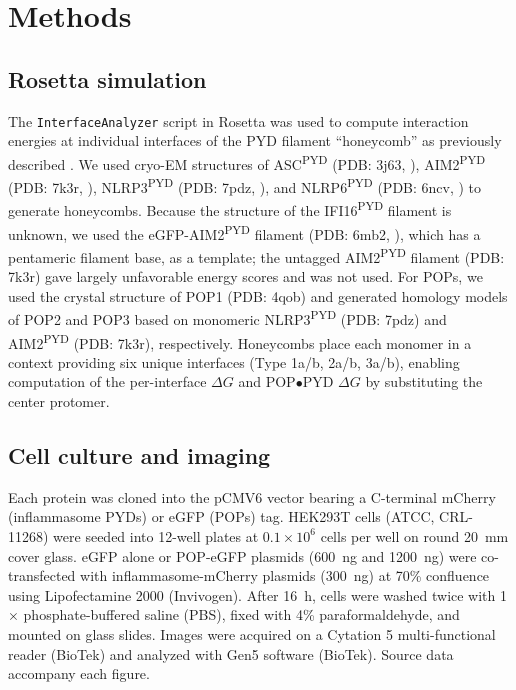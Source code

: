 \documentclass[11pt]{article}
\begin{document}
\section{Methods}
\subsection{Rosetta simulation}
The \texttt{InterfaceAnalyzer} script in Rosetta was used to compute interaction energies at individual interfaces of the PYD filament ``honeycomb'' as previously described \citep{matyszewski2021}. We used cryo-EM structures of ASC\textsuperscript{PYD} (PDB: 3j63, \citealp{lu2014}), AIM2\textsuperscript{PYD} (PDB: 7k3r, \citealp{matyszewski2021}), NLRP3\textsuperscript{PYD} (PDB: 7pdz, \citealp{hochheiser2022a}), and NLRP6\textsuperscript{PYD} (PDB: 6ncv, \citealp{shen2019}) to generate honeycombs. Because the structure of the IFI16\textsuperscript{PYD} filament is unknown, we used the eGFP-AIM2\textsuperscript{PYD} filament (PDB: 6mb2, \citealp{lu2015}), which has a pentameric filament base, as a template; the untagged AIM2\textsuperscript{PYD} filament (PDB: 7k3r) gave largely unfavorable energy scores and was not used. For POPs, we used the crystal structure of POP1 (PDB: 4qob) and generated homology models of POP2 and POP3 based on monomeric NLRP3\textsuperscript{PYD} (PDB: 7pdz) and AIM2\textsuperscript{PYD} (PDB: 7k3r), respectively. Honeycombs place each monomer in a context providing six unique interfaces (Type 1a/b, 2a/b, 3a/b), enabling computation of the per-interface $\Delta G$ and POP$\bullet$PYD $\Delta G$ by substituting the center protomer.

\subsection{Cell culture and imaging}
Each protein was cloned into the pCMV6 vector bearing a C-terminal mCherry (inflammasome PYDs) or eGFP (POPs) tag. HEK293T cells (ATCC, CRL-11268) were seeded into 12-well plates at $0.1\times 10^6$ cells per well on round 20~mm cover glass. eGFP alone or POP-eGFP plasmids (600~ng and 1200~ng) were co-transfected with inflammasome-mCherry plasmids (300~ng) at 70\% confluence using Lipofectamine 2000 (Invivogen). After 16~h, cells were washed twice with 1$\times$ phosphate-buffered saline (PBS), fixed with 4\% paraformaldehyde, and mounted on glass slides. Images were acquired on a Cytation 5 multi-functional reader (BioTek) and analyzed with Gen5 software (BioTek). Source data accompany each figure.
\end{document}
